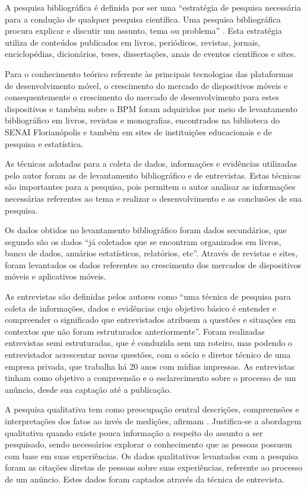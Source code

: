 \documentclass[
	12pt,				%
	openright,			%
	oneside,			%
	a4paper,			%
	chapter=TITLE,		%
	section=TITLE,		%
	english,			%
	french,				%
	spanish,			%
	brazil				%
	]{abntex2}
\begin{document}
A pesquisa bibliográfica é definida por ser uma “estratégia de pesquisa necessária para a condução de qualquer pesquisa científica. Uma pesquisa bibliográfica procura explicar e discutir um assunto, tema ou problema” \cite[p. 54]{martinsTheophiloMetodologia}. Esta estratégia utiliza de conteúdos publicados em livros, periódicos, revistas, jornais, enciclopédias, dicionários, teses, dissertações, anais de eventos científicos e sites.

Para o conhecimento teórico referente às principais tecnologias das plataformas de desenvolvimento móvel, o crescimento do mercado de dispositivos móveis e consequentemente o crescimento do mercado de desenvolvimento para estes dispositivos e também sobre o BPM foram adquiridos por meio de levantamento bibliográfico em livros, revistas e monografias, encontrados na biblioteca do SENAI Florianópolis e também em sites de instituições educacionais e de pesquisa e estatística.

As técnicas adotadas para a coleta de dados, informações e evidências utilizadas pelo autor foram as de levantamento bibliográfico e de entrevistas. Estas técnicas são importantes para a pesquisa, pois permitem o autor analisar as informações necessárias referentes ao tema e realizar o desenvolvimento e as conclusões de sua pesquisa.

Os dados obtidos no levantamento bibliográfico foram dados secundários, que segundo  são os dados “já coletados que se encontram organizados em livros, banco de dados, anuários estatísticos, relatórios, etc”. Através de revistas e sites, foram levantados os dados referentes ao crescimento dos mercados de dispositivos móveis e aplicativos móveis.

As entrevistas são definidas pelos autores  como “uma técnica de pesquisa para coleta de informações, dados e evidências cujo objetivo básico é entender e compreender o significado que entrevistados atribuem a questões e situações em contextos que não foram estruturados anteriormente”. Foram realizadas entrevistas semi estruturadas, que é conduzida sem um roteiro, mas podendo o entrevistador acrescentar novas questões, com o sócio e diretor técnico de uma empresa privada, que trabalha há 20 anos com mídias impressas. As entrevistas tinham como objetivo a compreensão e o esclarecimento sobre o processo de um anúncio, desde sua captação até a publicação.

A pesquisa qualitativa tem como preocupação central descrições, compreensões e interpretações dos fatos ao invés de medições, afirmam . Justifica-se a abordagem qualitativa quando existe pouca informação a respeito do assunto a ser pesquisado, sendo necessários explorar o conhecimento que as pessoas possuem com base em suas experiências. Os dados qualitativos levantados com a pesquisa foram as citações diretas de pessoas sobre suas experiências, referente ao processo de um anúncio. Estes dados foram captados através da técnica de entrevista.
\end{document}
